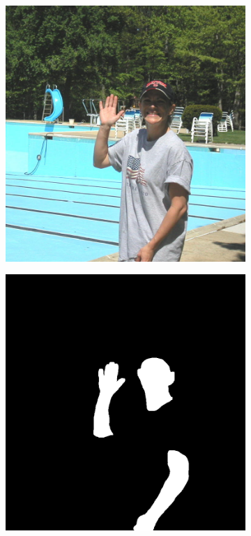 \begin{figure}[h]
\begin{subfigure}[b]{0.18\textwidth}
     \end{subfigure}
     \begin{subfigure}[b]{0.18\textwidth}
         \centering
         \includegraphics[width=\textwidth]{images/results/base_st/wd2002-sue-shaded-hat_x.png}
     \end{subfigure}
     \hfill
     \begin{subfigure}[b]{0.18\textwidth}
         \centering
         \includegraphics[width=\textwidth]{images/results/base_st/wd2002-sue-shaded-hat_y.png}

\end{subfigure}
\end{figure}
